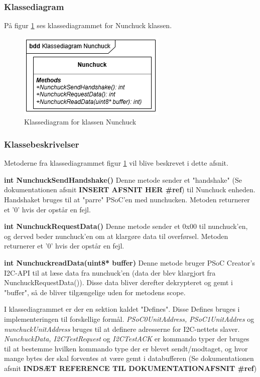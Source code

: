\subsubsection{Klassediagram}
På figur \ref{figure:NunchuckKlassediagram} ses klassediagrammet for Nunchuck klassen.

\begin{figure}[H]
	\centering
	\includegraphics[]{DesignOgImplementering/images/nunchuck}
	\caption{Klassediagram for klassen Nunchuck}
	\label{figure:NunchuckKlassediagram}
\end{figure}

\subsubsection{Klassebeskrivelser}
Metoderne fra klassediagrammet figur \ref{figure:NunchuckKlassediagram} vil blive beskrevet i dette afsnit.

\noindent\textbf{int NunchuckSendHandshake()}\newline
Denne metode sender et "handshake" (Se dokumentationen afsnit \textbf{INSERT AFSNIT HER \#ref}) til Nunchuck enheden. Handshaket bruges til at "parre" PSoC'en med nunchucken. Metoden returnerer et '0' hvis der opstår en fejl. \newline

\noindent\textbf{int NunchuckRequestData()}\newline
Denne metode sender et 0x00 til nunchuck'en, og derved beder nunchuck'en om at klargøre data til overførsel. Metoden returnerer et '0' hvis der opstår en fejl. \newline

\noindent\textbf{int NunchuckreadData(uint8* buffer)}\newline
Denne metode bruger PSoC Creator's I2C-API til at læse data fra nunchuck'en (data der blev klargjort fra NunchuckRequestData()). Disse data bliver derefter dekrypteret og gemt i "buffer", så de bliver tilgængelige uden for metodens scope. \newline

I klassediagrammet er der en sektion kaldet "Defines". Disse Defines bruges i implementeringen til forskellige formål. \textit{PSoC0UnitAddress, PSoC1UnitAddres} og \textit{nunchuckUnitAddress} bruges til at definere adresserne for I2C-nettets slaver. \textit{NunchuckData, I2CTestRequest} og \textit{I2CTestACK} er kommando typer der bruges til at bestemme hvilken kommando type der er blevet sendt/modtaget, og hvor mange bytes der skal forventes at være gemt i databufferen (Se dokumentationen afsnit \textbf{INDSÆT REFERENCE TIL DOKUMENTATIONAFSNIT \#ref}) 

